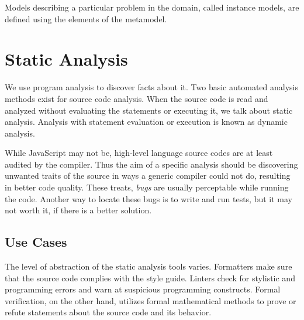 Models describing a particular problem in the domain, called instance models, are defined using the elements of the metamodel.

\section{Static Analysis}

We use program analysis to discover facts about it. Two basic automated analysis methods exist for source code analysis. When the source code is read and analyzed without evaluating the statements or executing it, we talk about static analysis. Analysis with statement evaluation or execution is known as dynamic analysis.


While JavaScript may not be, high-level language source codes are at least audited by the compiler. Thus the aim of a specific analysis should be discovering unwanted traits of the source in ways a generic compiler could not do, resulting in better code quality. These treats, \emph{bugs} are usually perceptable while running the code. Another way to locate these bugs is to write and run tests, but it may not worth it, if there is a better solution.



\subsection{Use Cases}
The level of abstraction of the static analysis tools varies. Formatters make sure that the source code complies with the style guide. Linters check for stylistic and programming errors and warn at suspicious programming constructs. Formal verification, on the other hand, utilizes formal mathematical methods to prove or refute statements about the source code and its behavior.

